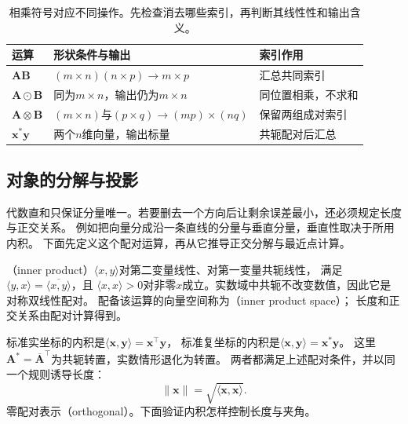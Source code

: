\begin{table}[htbp]
 \centering\small
 \begin{tabularx}{\linewidth}{@{}lXX@{}}
 \toprule
 运算 & 形状条件与输出 & 索引作用\\
 \midrule
 $\bm A\bm B$ & $(m\times n)(n\times p)\to m\times p$ & 汇总共同索引\\
 $\bm A\odot\bm B$ & 同为$m\times n$，输出仍为$m\times n$ & 同位置相乘，不求和\\
 $\bm A\otimes\bm B$ & $(m\times n)$与$(p\times q)\to(mp)\times(nq)$ & 保留两组成对索引\\
 $\bm x^*\bm y$ & 两个$n$维向量，输出标量 & 共轭配对后汇总\\
 \bottomrule
 \end{tabularx}
 \caption{相乘符号对应不同操作。先检查消去哪些索引，再判断其线性性和输出含义。}
 \label{tab:linear-algebra-products-and-shapes}
\end{table}

\subsection{对象的分解与投影}
\label{sec:linear-algebra-decomposition-projection}
\label{sec:linear-algebra-length-angle-distance}

代数直和只保证分量唯一。若要删去一个方向后让剩余误差最小，还必须规定长度与正交关系。
例如把向量分成沿一条直线的分量与垂直分量，垂直性取决于所用内积。
下面先定义这个配对运算，再从它推导正交分解与最近点计算。
\begin{definition}[实与复内积]
\label{def:linear-algebra-inner-product}
\label{def:functional-inner-product-space}
（inner product）$\langle x,y\rangle$对第二变量线性、对第一变量共轭线性，
满足$\langle y,x\rangle=\overline{\langle x,y\rangle}$，且
$\langle x,x\rangle>0$对非零$x$成立。实数域中共轭不改变数值，因此它是对称双线性配对。
配备该运算的向量空间称为（inner product space）；
长度和正交关系由配对计算得到。
\end{definition}
标准实坐标的内积是$\langle\bm x,\bm y\rangle=\bm x^\top\bm y$，
标准复坐标的内积是$\langle\bm x,\bm y\rangle=\bm x^*\bm y$。
这里$\bm A^*=\overline{\bm A}^{\top}$为共轭转置，实数情形退化为转置。
两者都满足上述配对条件，并以同一个规则诱导长度：
\begin{equation}
 \lVert\bm x\rVert=\sqrt{\langle\bm x,\bm x\rangle}.
 \label{eq:linear-algebra-inner-product-norm}
\end{equation}
零配对表示（orthogonal）。下面验证内积怎样控制长度与夹角。

